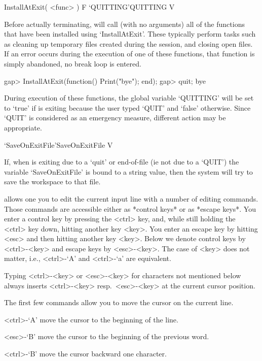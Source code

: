 \>InstallAtExit( <func> ) F
\>`QUITTING'{QUITTING} V

Before actually terminating, {\GAP} will call (with no arguments) all
of the functions that have been installed using `InstallAtExit'. These
typically perform tasks such as cleaning up temporary files created
during the session, and closing open files. If an error occurs during
the execution of one of these functions, that function is simply
abandoned, no break loop is entered. 

\begintt
gap> InstallAtExit(function() Print("bye\n"); end);
gap> quit;
bye
\endtt

During execution of these functions, the global variable `QUITTING'
will be set to `true' if {\GAP} is exiting because the user typed
`QUIT' and `false' otherwise. Since `QUIT' is considered as an emergency
measure, different action may be appropriate.

\>`SaveOnExitFile'{SaveOnExitFile} V

If, when {\GAP} is exiting due to a `quit' or end-of-file (ie not due
to a `QUIT') the variable `SaveOnExitFile' is bound to a string value,
then the system will try to save the workspace to that file.




{\GAP} allows one you to edit the current input line with a number of editing
commands. Those commands are accessible either as *control keys* or as
*escape keys*. You enter a control key by pressing the <ctrl> key, and,
while still holding the <ctrl> key down, hitting another key <key>. You
enter an escape key by hitting <esc> and then hitting another key <key>.
Below we denote control keys by <ctrl>-<key> and escape keys by
<esc>-<key>. The case of <key> does not matter, i.e., <ctrl>-`A' and
<ctrl>-`a' are equivalent.

Typing <ctrl>-<key> or <esc>-<key> for characters not mentioned below
always inserts <ctrl>-<key> resp.~<esc>-<key> at the current cursor position.

The first few commands allow you to move the cursor on the current line.

<ctrl>-`A' move the cursor to the beginning of the line. 

<esc>-`B' move the cursor to the beginning of the previous word. 

<ctrl>-`B' move the cursor backward one character. 

